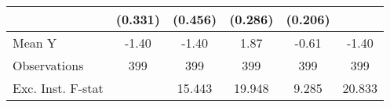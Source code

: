 {\begin{tabular}{l*{5}{c}}
            &     (0.331)         &     (0.456)         &     (0.286)         &     (0.206)         &                     \\
\midrule
Mean Y      &       -1.40         &       -1.40         &        1.87         &       -0.61         &       -1.40         \\
Observations&         399         &         399         &         399         &         399         &         399         \\
Exc. Inst. F-stat&                     &      15.443         &      19.948         &       9.285         &      20.833         \\
\bottomrule
\end{tabular}
}
